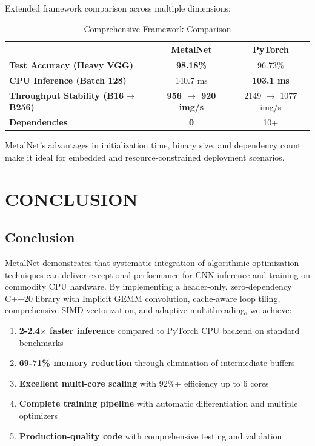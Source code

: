 \documentclass[12pt,oneside,a4paper]{report}
\newcommand{\hdr}{\rowcolor{mnHeaderBg}}
\newcommand{\hcell}[1]{{\bfseries\color{white}#1}}
\newcommand{\win}[1]{{\bfseries\color{mnGreen}#1}}
\newcommand{\zebra}{\rowcolors{2}{mnRowA}{mnRowB}}
\newenvironment{ptable}[2]{%
  \begin{table}[H]\centering
  \caption{#1}%
  \vspace{2pt}%
  \zebra
  \setlength{\arrayrulewidth}{0.5pt}%
  \begin{tabular}{#2}\toprule}%
  {\bottomrule\end{tabular}\end{table}}
\begin{document}
Extended framework comparison across multiple dimensions:

\begin{ptable}{Comprehensive Framework Comparison}{>{\bfseries\color{mnPrimary}}l c c}
\hdr \hcell{Metric} & \hcell{MetalNet} & \hcell{PyTorch} \\ \midrule
Test Accuracy (Heavy VGG) & \win{98.18\%} & 96.73\% \\
CPU Inference (Batch 128) & 140.7 ms & \win{103.1 ms} \\
Throughput Stability (B16$\rightarrow$B256)& \win{956 $\rightarrow$ 920 img/s} & 2149 $\rightarrow$ 1077 img/s \\
Dependencies           & \win{0}      & 10+ \\
\end{ptable}

MetalNet's advantages in initialization time, binary size, and dependency count make it ideal for embedded and resource-constrained deployment scenarios.


\newpage

\chapter{CONCLUSION}

\section{Conclusion}

MetalNet demonstrates that systematic integration of algorithmic optimization techniques can deliver exceptional performance for CNN inference and training on commodity CPU hardware. By implementing a header-only, zero-dependency C++20 library with Implicit GEMM convolution, cache-aware loop tiling, comprehensive SIMD vectorization, and adaptive multithreading, we achieve:

\begin{enumerate}
    \item \textbf{2-2.4$\times$ faster inference} compared to PyTorch CPU backend on standard benchmarks
    \item \textbf{69-71\% memory reduction} through elimination of intermediate buffers
    \item \textbf{Excellent multi-core scaling} with 92\%+ efficiency up to 6 cores
    \item \textbf{Complete training pipeline} with automatic differentiation and multiple optimizers
    \item \textbf{Production-quality code} with comprehensive testing and validation
\end{enumerate}
\end{document}
